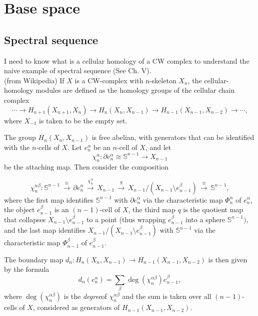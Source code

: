 \section{Base space}

 \subsection{Spectral sequence}
 I need to know what is a cellular homology of a CW complex to understand the naive example of spectral sequence (See \cite{hatcher} Ch. V).\\ 
 (from Wikipedia) If $X$ is a CW-complex with n-skeleton  $X_{n}$, the cellular-homology modules are defined as the homology groups of the cellular chain complex
\[\cdots \to {H_{n+1}}(X_{n+1},X_{n})\to {H_{n}}(X_{n},X_{n-1})\to {H_{n-1}}(X_{n-1},X_{n-2})\to \cdots ,\]
where  $X_{-1}$ is taken to be the empty set.

The group ${H_{n}}(X_{n},X_{n-1})$ is free abelian, with generators that can be identified with the  $n$-cells of  $X$. Let  $e_{n}^{\alpha }$ be an $n$-cell of $X$, and let  \[ \chi _{n}^{\alpha }:\partial e_{n}^{\alpha }\cong \mathbb {S} ^{n-1}\to X_{n-1}\] be the attaching map. Then consider the composition

 \[\chi _{n}^{\alpha \beta }:\mathbb {S} ^{n-1}\,{\stackrel {\cong }{\longrightarrow }}\,\partial e_{n}^{\alpha }\,{\stackrel {\chi _{n}^{\alpha }}{\longrightarrow }}\,X_{n-1}\,{\stackrel {q}{\longrightarrow }}\,X_{n-1}/\left(X_{n-1}\setminus e_{n-1}^{\beta }\right)\,{\stackrel {\cong }{\longrightarrow }}\,\mathbb {S} ^{n-1},\]
where the first map identifies $\mathbb {S} ^{n-1}$ with $\partial e_{n}^{\alpha }$ via the characteristic map  $\Phi _{n}^{\alpha }$ of $e_{n}^{\alpha }$, the object $e_{n-1}^{\beta }$ is an  $(n-1)$-cell of $X$, the third map  $q$ is the quotient map that collapses $X_{n-1}\setminus e_{n-1}^{\beta }$ to a point (thus wrapping  $e_{n-1}^{\beta }$ into a sphere  $\mathbb {S} ^{n-1})$, and the last map identifies $X_{n-1}/\left(X_{n-1}\setminus e_{n-1}^{\beta }\right)$ with  $\mathbb {S} ^{n-1}$ via the characteristic map  $\Phi _{n-1}^{\beta }$ of  $e_{n-1}^{\beta }$.

The boundary map $d_{n}:{H_{n}}(X_{n},X_{n-1})\to {H_{n-1}}(X_{n-1},X_{n-2})$ is then given by the formula
 \[{d_{n}}(e_{n}^{\alpha })=\sum _{\beta }\deg \left(\chi _{n}^{\alpha \beta }\right)e_{n-1}^{\beta },\]
where  $\deg \left(\chi _{n}^{\alpha \beta }\right)$ is the \textit{degree}\footnotemark of  $\chi _{n}^{\alpha \beta }$ and the sum is taken over all $(n-1)$-cells of $X$, considered as generators of ${H_{n-1}}(X_{n-1},X_{n-2})$.

